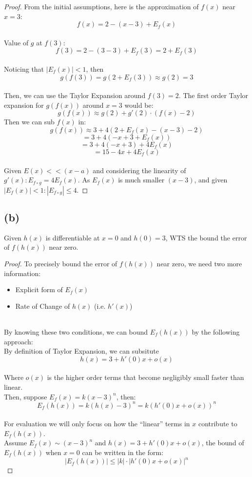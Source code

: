 \documentclass{article}
\begin{document}
\begin{proof}
    From the initial assumptions, here is the approximation of $f(x)$ near $x = 3$: 
    \[f(x) = 2 - (x - 3) + E_f(x)\]
    \\
    Value of $g$ at $f(3)$:
    \[ f(3) = 2 - (3- 3) + E_f(3) = 2 + E_f(3) \]
    \\
    Noticing that $|E_f(x)| < 1$, then
    \[ g(f(3)) = g(2 + E_f(3)) \approx g(2) = 3 \]
    \\
    Then, we can use the Taylor Expansion around $f(3) = 2$. 
    The first order Taylor expansion for $g(f(x))$ around $x = 3$ would be:
    \[ g(f(x)) \approx g(2) + g'(2) \cdot (f(x) - 2) \]
    Then we can sub $f(x)$ in:
    \[ g(f(x)) \approx 3 + 4(2 + E_f(x) - (x - 3) - 2) \]
    \[ = 3 + 4(-x + 3 + E_f(x)) \]
    \[ = 3 + 4(-x + 3) + 4E_f(x) \]
    \[ = 15 - 4x + 4E_f(x) \]
    \\
    Given $E(x) << (x - a)$  and considering the linearity of \( g'(x): E_{f \circ g} = 4E_f(x) \).
    As $E_f(x)$ is much smaller $(x - 3)$, and given $|E_f(x)| < 1: |E_{f \circ g}| \leq 4$.
\end{proof}

\newpage

\subsection*{(b)}
Given $h(x)$ is differentiable at $x = 0$ and $h(0) = 3$, WTS       the bound the
error of $f(h(x))$ near zero.
\\
\begin{proof}
    To precisely bound the error of $f(h(x))$ near zero, we need two more information:
    \begin{itemize}
        \item Explicit form of $E_f(x)$
        \item Rate of Change of $h(x)$ (i.e. $h'(x)$)
    \end{itemize}
    \\
    By knowing these two conditions, we can bound $E_f(h(x))$ by the following approach:
    \\
    By definition of Taylor Expansion, we can subsitute
    \[ h(x) = 3 + h'(0)x + o(x) \]
    \\
    Where $o(x)$ is the higher order terms that become negligibly small faster than linear.
    \\
    Then, suppose $E_f(x) = k(x - 3)^n$, then:
    \[ E_f(h(x)) = k(h(x) - 3)^n = k(h'(0)x + o(x))^n \]
    \\
    For evaluation we will only focus on how the ``linear'' terms in $x$ contribute to $E_f(h(x))$.
    \\
    Assume $E_f(x) \sim (x - 3)^n$ and $h(x) = 3 + h'(0)x + o(x)$, the bound of $E_f(h(x))$ when $x = 0$ can be written in the form:
    \[ |E_f(h(x))| \leq |k| \cdot |h'(0)x + o(x)|^n \]

\end{proof}
\end{document}
